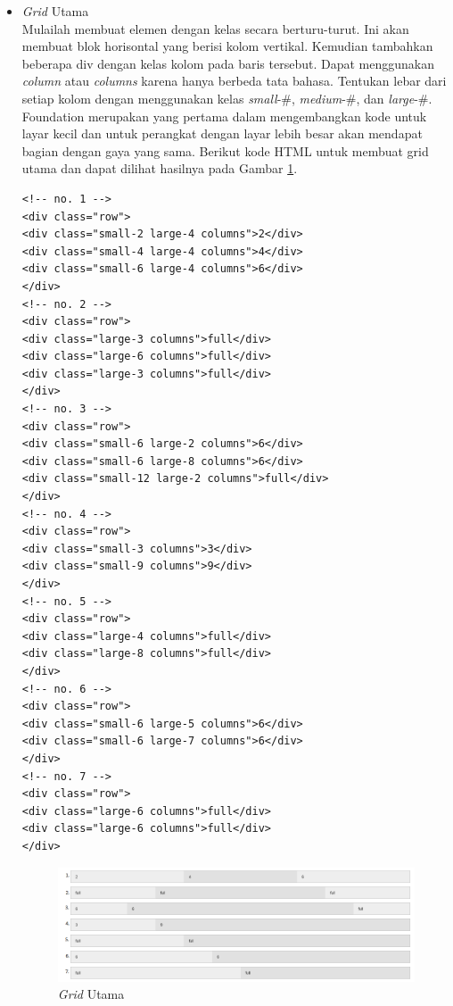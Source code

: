 \begin{enumerate}[(1)]
\begin{itemize}
\item {\it Grid} Utama\\
Mulailah membuat elemen dengan kelas secara berturu-turut. Ini akan membuat blok horisontal yang berisi kolom vertikal. Kemudian tambahkan beberapa div dengan kelas kolom pada baris tersebut. Dapat menggunakan {\it column} atau {\it columns} karena hanya berbeda tata bahasa. Tentukan lebar dari setiap kolom dengan menggunakan kelas {\it small}-\#, {\it medium}-\#, dan {\it large}-\#. Foundation merupakan yang pertama dalam mengembangkan kode untuk layar kecil dan untuk perangkat dengan layar lebih besar akan mendapat bagian dengan gaya yang sama. Berikut kode HTML untuk membuat grid utama dan dapat dilihat hasilnya pada Gambar \ref{fig:gridutama}.
\begin{lstlisting}[basicstyle=\footnotesize]
<!-- no. 1 -->
<div class="row">
<div class="small-2 large-4 columns">2</div>
<div class="small-4 large-4 columns">4</div>
<div class="small-6 large-4 columns">6</div>
</div>
<!-- no. 2 -->
<div class="row">
<div class="large-3 columns">full</div>
<div class="large-6 columns">full</div>
<div class="large-3 columns">full</div>
</div>
<!-- no. 3 -->
<div class="row">
<div class="small-6 large-2 columns">6</div>
<div class="small-6 large-8 columns">6</div>
<div class="small-12 large-2 columns">full</div>
</div>
<!-- no. 4 -->
<div class="row">
<div class="small-3 columns">3</div>
<div class="small-9 columns">9</div>
</div>
<!-- no. 5 -->
<div class="row">
<div class="large-4 columns">full</div>
<div class="large-8 columns">full</div>
</div>
<!-- no. 6 -->
<div class="row">
<div class="small-6 large-5 columns">6</div>
<div class="small-6 large-7 columns">6</div>
</div>
<!-- no. 7 -->
<div class="row">
<div class="large-6 columns">full</div>
<div class="large-6 columns">full</div>
</div>
\end{lstlisting}
\begin{figure}[H]
\centering
\includegraphics[scale=0.6]{Gambar/gridutama.png}
\caption[{\it Grid} Utama]{{\it Grid} Utama}
\label{fig:gridutama}
\end{figure}

\end{itemize}
\end{enumerate}
